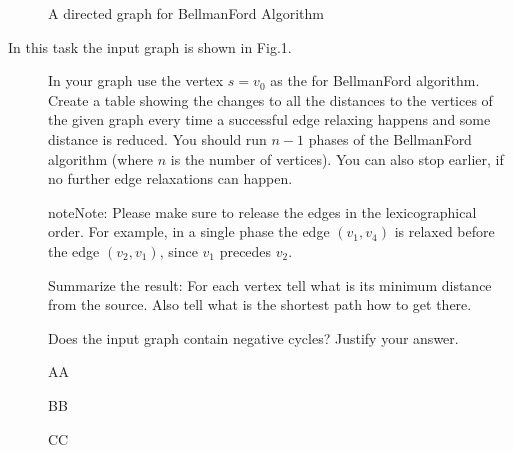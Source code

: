 \documentclass[letterpaper,10pt,english,openany,oneside]{sphinxmanual}
\begin{document}
\begin{figure}[htbp]
\centering
\capstart

\noindent{}
\caption{A directed graph for Bellman\sphinxhyphen{}Ford Algorithm}\label{\detokenize{assignment08:id1}}\end{figure}

\sphinxAtStartPar
In this task the input graph is shown in Fig.1.
\begin{description}
\item[{}] \leavevmode
\sphinxAtStartPar
In your graph use the vertex \(s=v_0\) as the 
for Bellman\sphinxhyphen{}Ford algorithm.
Create a table showing the changes
to all the distances to the vertices of the given graph every time a successful edge
relaxing happens and some distance is reduced.
You should run \(n-1\) phases of the Bellman\sphinxhyphen{}Ford algorithm
(where \(n\) is the number of vertices). You can also stop earlier, if
no further edge relaxations can happen.

\begin{sphinxadmonition}{note}{Note:}
\sphinxAtStartPar
Please make sure to release the edges in the lexicographical order.
For example, in a single phase the edge \((v_1,v_4)\) is
relaxed before the edge \((v_2,v_1)\), since
\(v_1\) precedes \(v_2\).
\end{sphinxadmonition}

\item[{}] \leavevmode
\sphinxAtStartPar
Summarize the result: For each vertex
tell what is its minimum distance from the source.
Also tell what is the shortest path how to get there.

\item[{}] \leavevmode
\sphinxAtStartPar
Does the input graph contain negative cycles?
Justify your answer.

\end{description}

\sphinxAtStartPar
{\color{blue}
\begin{description}
\item[{}] \leavevmode
\sphinxAtStartPar
AA

\item[{}] \leavevmode
\sphinxAtStartPar
BB

\item[{}] \leavevmode
\sphinxAtStartPar
CC

\end{description}

}%
\renewcommand{\indexname}{Index}
\printindex
\end{document}
